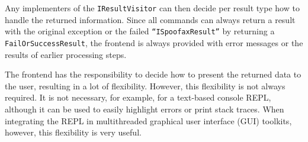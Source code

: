 Any implementers of the \texttt{IResultVisitor} can then decide per result type
how to handle the returned information. Since all commands can always return a
result with the original exception or the failed \texttt{``ISpoofaxResult''} by
returning a \texttt{FailOrSuccessResult}, the frontend is always provided with
error messages or the results of earlier processing steps.

The frontend has the responsibility to decide how to present the returned data
to the user, resulting in a lot of flexibility. However, this flexibility is not
always required. It is not necessary, for example, for a text-based console
REPL, although it can be used to easily highlight errors or print stack
traces. When integrating the REPL in multithreaded graphical user interface
(GUI) toolkits, however, this flexibility is very useful.

